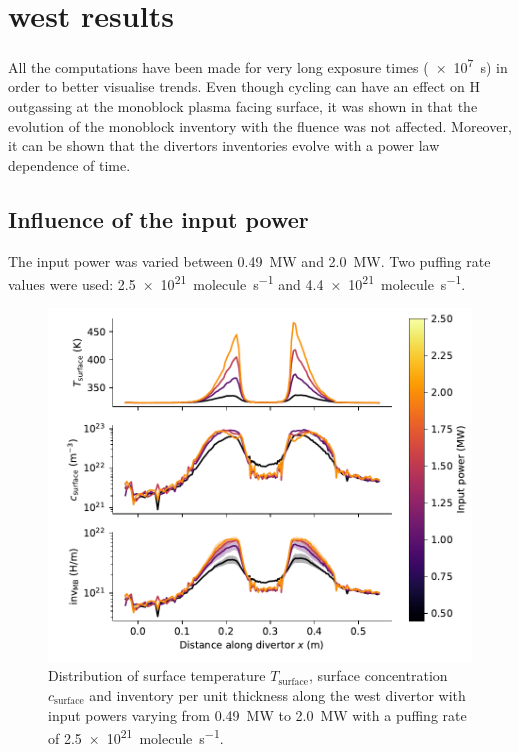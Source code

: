\section{\gls{west} results}

All the computations have been made for very long exposure times (\SI{e7}{s}) in order to better visualise trends.
Even though cycling can have an effect on \gls{H} outgassing at the \gls{monoblock} plasma facing surface, it was shown in  that the evolution of the \gls{monoblock} \gls{inventory} with the fluence was not affected.
Moreover, it can be shown that the \glspl{divertor} inventories evolve with a power law dependence of time.

\subsection{Influence of the input power}

The input power was varied between \SI{0.49}{MW} and \SI{2.0}{MW}.
Two puffing rate values were used: \SI{2.5e21}{molecule.s^{-1}} and \SI{4.4e21}{molecule.s^{-1}}.

\begin{figure}[h]
    \centering
    \includegraphics[width=\linewidth]{Figures/Chapter4/WEST/inventory_along_divertor_input_power.pdf}
    \caption{Distribution of surface temperature $T_\mathrm{surface}$, surface concentration $c_\mathrm{surface}$ and \gls{inventory} per unit thickness along the \gls{west} \gls{divertor} with input powers varying from \SI{0.49}{MW} to \SI{2.0}{MW} with a puffing rate of \SI{2.5e21}{molecule.s^{-1}}.}
\end{figure}

